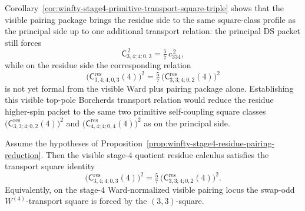 \begin{remark}
\label{rem:winfty-stage4-primitive-transport-gap}
Corollary~\ref{cor:winfty-stage4-primitive-transport-square-triple}
shows that the visible pairing package brings the residue side to the
same square-class profile as the principal side up to one additional
transport relation: the principal DS packet still forces
\[
\mathsf{C}_{3,4;4;0,3}^{\,2}
=
\tfrac{5}{7}\,c_{334}^{\,2},
\]
while on the residue side the corresponding relation
\[
\bigl(\mathsf{C}^{\mathrm{res}}_{3,4;4;0,3}(4)\bigr)^2
=
\tfrac{5}{7}\,
\bigl(\mathsf{C}^{\mathrm{res}}_{3,3;4;0,2}(4)\bigr)^2
\]
is not yet formal from the visible Ward plus pairing package alone.
Establishing this visible top-pole Borcherds transport relation would
reduce the residue higher-spin packet to the same two primitive
self-coupling square classes
\(
\bigl(\mathsf{C}^{\mathrm{res}}_{3,3;4;0,2}(4)\bigr)^2
\)
and
\(
\bigl(\mathsf{C}^{\mathrm{res}}_{4,4;4;0,4}(4)\bigr)^2
\)
as on the principal side.
\end{remark}

\begin{conjecture}
\label{conj:winfty-stage4-visible-borcherds-transport}
\ClaimStatusConjectured{}
Assume the hypotheses of
Proposition~\ref{prop:winfty-stage4-residue-pairing-reduction}.  Then
the visible stage-$4$ quotient residue calculus satisfies the transport
square identity
\[
\bigl(\mathsf{C}^{\mathrm{res}}_{3,4;4;0,3}(4)\bigr)^2
=
\tfrac{5}{7}\,
\bigl(\mathsf{C}^{\mathrm{res}}_{3,3;4;0,2}(4)\bigr)^2.
\]
Equivalently, on the stage-$4$ Ward-normalized visible pairing locus
the swap-odd \(W^{(4)}\)-transport square is forced by the
\((3,3)\)-square.
\end{conjecture}


